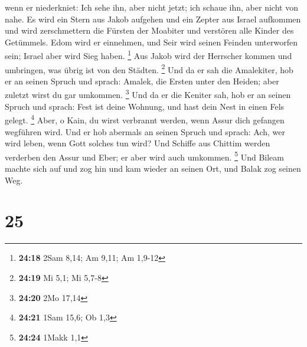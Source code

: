 wenn er niederkniet:  Ich sehe ihn, aber nicht jetzt; ich
schaue ihn, aber nicht von nahe. Es wird ein Stern aus Jakob aufgehen
und ein Zepter aus Israel aufkommen und wird zerschmettern die Fürsten
der Moabiter und verstören alle Kinder des Getümmels. 
Edom wird er einnehmen, und Seir wird seinen Feinden unterworfen sein;
Israel aber wird Sieg haben. \footnote{\textbf{24:18} 2Sam 8,14; Am
  9,11; Am 1,9-12}  Aus Jakob wird der Herrscher kommen
und umbringen, was übrig ist von den Städten. \footnote{\textbf{24:19}
  Mi 5,1; Mi 5,7-8}  Und da er sah die Amalekiter, hob er
an seinen Spruch und sprach: Amalek, die Ersten unter den Heiden; aber
zuletzt wirst du gar umkommen. \footnote{\textbf{24:20} 2Mo 17,14}
 Und da er die Keniter sah, hob er an seinen Spruch und
sprach: Fest ist deine Wohnung, und hast dein Nest in einen Fels gelegt.
\footnote{\textbf{24:21} 1Sam 15,6; Ob 1,3}  Aber, o
Kain, du wirst verbrannt werden, wenn Assur dich gefangen wegführen
wird.  Und er hob abermals an seinen Spruch und sprach:
Ach, wer wird leben, wenn Gott solches tun wird?  Und
Schiffe aus Chittim werden verderben den Assur und Eber; er aber wird
auch umkommen. \footnote{\textbf{24:24} 1Makk 1,1}  Und
Bileam machte sich auf und zog hin und kam wieder an seinen Ort, und
Balak zog seinen Weg.

\hypertarget{section-24}{%
\section{25}\label{section-24}}

